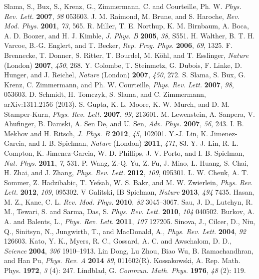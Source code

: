 \documentclass[journal,article,accept,moreauthors,pdftex,12pt,a4paper]{mdpi}
\begin{document}
\begin{thebibliography}{999}
Slama, S., Bux, S., Krenz, G., Zimmermann, C. and Courteille, Ph. W. {\em Phys. Rev. Lett.} {\bf 2007}, {\em 98} 053603.
J. M. Raimond, M. Brune, and S. Haroche, {\em Rev. Mod. Phys.} {\bf 2001}, {\em 73}, 565.
R. Miller, T. E. Northup, K. M. Birnbaum, A. Boca, A. D. Boozer, and H. J. Kimble, {\em J. Phys. B} {\bf 2005}, {\em 38}, S551.
H. Walther, B. T. H. Varcoe, B.-G. Englert, and T. Becker, {\em Rep. Prog. Phys.} {\bf 2006}, {\em 69}, 1325.
F. Brennecke, T. Donner, S. Ritter, T. Bourdel, M. Köhl, and T. Esslinger, {\em Nature} (London) {\bf 2007}, {\em 450}, 268.
Y. Colombe, T. Steinmetz, G. Dubois, F. Linke, D. Hunger, and J. Reichel, {\em Nature} (London) {\bf 2007}, {\em 450}, 272.
S. Slama, S. Bux, G. Krenz, C. Zimmermann, and Ph. W. Courteille, {\em Phys. Rev. Lett.} {\bf 2007}, {\em 98}, 053603.
D. Schmidt, H. Tomczyk, S. Slama, and C. Zimmermann, arXiv:1311.2156 (2013).
S. Gupta, K. L. Moore, K. W. Murch, and D. M. Stamper-Kurn, {\em Phys. Rev. Lett.} {\bf 2007}, {\em 99}, 213601.
M. Lewenstein, A. Sanpera, V. Ahufinger, B. Damski, A. Sen De, and U. Sen, {\em Adv. Phys.} {\bf 2007}, {\em 56}, 243.
I. B. Mekhov and H. Ritsch, {\em J. Phys. B} {\bf 2012}, {\em 45}, 102001.
Y.-J. Lin, K. Jimenez-Garcia, and I. B. Spielman, {\em Nature} (London) {\bf 2011}, {\em 471}, 83.
Y.-J. Lin, R. L. Compton, K. Jimenez-Garcia, W. D. Phillips, J. V. Porto, and I. B. Spielman, {\em Nat. Phys.} {\bf 2011}, {\em 7}, 531.
P. Wang, Z.-Q. Yu, Z. Fu, J. Miao, L. Huang, S. Chai, H. Zhai, and J. Zhang, {\em Phys. Rev. Lett.} {\bf 2012}, {\em 109}, 095301.
L. W. Cheuk, A. T. Sommer, Z. Hadzibabic, T. Yefsah, W. S. Bakr, and M. W. Zwierlein, {\em Phys. Rev. Lett.} {\bf 2012}, {\em 109}, 095302.
V Galitski, IB Spielman, {\em Nature} {\bf 2013}, {\em 494} 7435.
Hasan, M. Z., Kane, C. L. {\em Rev. Mod. Phys.} {\bf 2010}, {\em 82} 3045–3067.
Sau, J. D., Lutchyn, R. M., Tewari, S. and Sarma, Das, S. {\em Phys. Rev. Lett.} {\bf 2010}, {\em 104} 040502.
Burkov, A. A. and Balents, L.,  {\em Phys. Rev. Lett.} {\bf 2011}, {\em 107} 127205. 
Sinova, J., Cilcer, D., Niu, Q., Sinitsyn, N., Jungwirth, T., and MacDonald, A.,  {\em Phys. Rev. Lett.} {\bf 2004}, {\em 92} 126603.
Kato, Y. K., Myers, R. C., Gossard, A. C. and Awschalom, D. D.,  {\em Science} {\bf 2004}, {\em 306} 1910–1913.
Lin Dong, Lu Zhou, Biao Wu, B. Ramachandhran, and Han Pu, {\em Phys. Rev. A} {\bf 2014} {\em 89}, 011602(R).
Kossakowski, A. { Rep. Math. Phys.} {\bf 1972}, {\em 3} (4): 247.
Lindblad, G. {\em Commun. Math. Phys.} {\bf 1976}, {\em 48} (2): 119.
\end{thebibliography}
\end{document}
